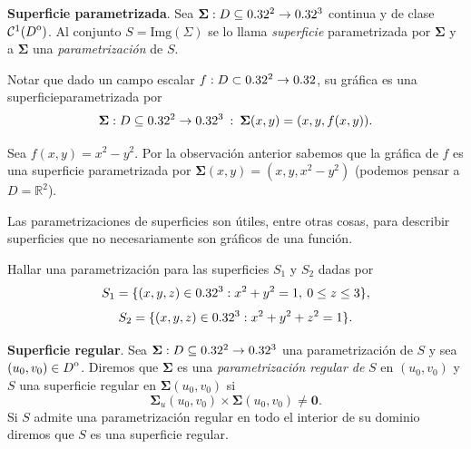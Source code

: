 


\begin{definition}\textbf{Superficie parametrizada}. Sea  $\boldsymbol{\Sigma}:D \subseteq0.32^2 \to0.32^3$ continua y de clase $\mathcal{C}^1({\kern0ptD}^{\mathrm{o}})$.  Al conjunto  $S = \text{Img}(\Sigma)$ se lo llama  \emph{superficie}   parametrizada por  $\boldsymbol{\Sigma}$  y   
   a  $\boldsymbol{\Sigma}$  una \emph{parametrizaci\'on} de $S$.
\end{definition}

\begin{obs} Notar que dado un campo escalar $f:D\subset 0.32^2\to0.32$, su gr\'afica  es una superficieparametrizada por  $$ \boldsymbol{\Sigma}:D \subseteq0.32^2 \to0.32^3\: : \: \boldsymbol{\Sigma}(x,y)=(x,y,f(x,y)). $$   
\end{obs}

\begin{example} Sea $f(x,y) = x^2-y^2$. Por la observaci\'on anterior sabemos que la gr\'afica de $f$ es una superficie parametrizada por $\boldsymbol{\Sigma}(x,y)=(x,y,x^2-y^2)$  (podemos pensar a $D = \mathbb{R}^{2}$).  

\vspace{0.3 cm}


\end{example}

\begin{obs}
Las parametrizaciones de superficies son \'utiles, entre otras cosas,  para describir superficies que no necesariamente son gr\'aficos de una funci\'on. 
\end{obs}

\begin{tarea}\label{parametrizaciones} Hallar una parametrizaci\'on para  las  superficies $S_1$ y $S_2$  dadas por $$S_1=\{ (x,y,z) \in 0.32^3:  x^{2}+y^{2} =1, \: 0\leq z \leq 3 \},$$ 
$$S_2=\{ (x,y,z) \in 0.32^3:  x^{2}+y^{2} +z^{2} = 1 \}.$$
\end{tarea}


\begin{definition}\textbf{Superficie regular}. 
 Sea $\boldsymbol{\Sigma}:D\subseteq0.32^2 \to0.32^3$ una parametrizaci\'on de $S$ y sea $(u_0, v_0) \in {\kern0ptD}^{\mathrm{o}}$.   Diremos que $\boldsymbol{\Sigma}$ es una     
\emph{parametrizaci\'on regular de}  $S$ en  $(u_0, v_0)$  y $S$ una superficie regular en $\boldsymbol{\Sigma}(u_0,v_0)$  si
    \[
       \boldsymbol{\Sigma}_u(u_0,v_0)\times\boldsymbol{\Sigma}(u_0,v_0)\neq \boldsymbol{0}.
   \]
 Si $S$   admite una parametrizaci\'on regular en todo el interior de su dominio diremos que  $S$ es una superficie regular.
 \end{definition}

